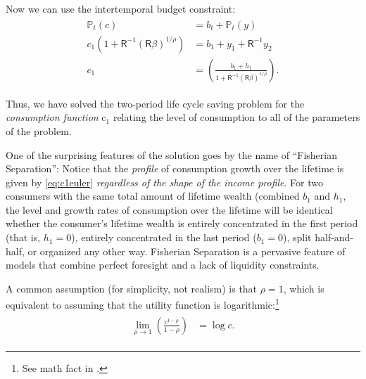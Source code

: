 \documentclass{scrartcl}
\begin{document}
  Now we can use the intertemporal budget constraint:
  \begin{equation}\begin{gathered}\begin{aligned} {\mathbb{P}}_{t}(\boldsymbol{\mathit{c}}) & = \boldsymbol{\mathit{b}}_{t}+{\mathbb{P}}_{t}(y) \\ \boldsymbol{\mathit{c}}_{1}\left(1+\mathsf{R}^{-1}(\mathsf{R}\beta)^{1/\rho}\right) & = \boldsymbol{\mathit{b}}_{1}+\boldsymbol{\mathit{y}}_{1}+\mathsf{R}^{-1}\boldsymbol{\mathit{y}}_{2} \\ \boldsymbol{\mathit{c}}_{1} & = \left(\frac{\boldsymbol{\mathit{b}}_{1}+\boldsymbol{\mathit{h}}_{1}}{1+\mathsf{R}^{-1}(\mathsf{R}\beta)^{1/\rho}}\right).
      \end{aligned}\end{gathered}\end{equation}

  Thus, we have solved the two-period life cycle saving problem for the \textit{consumption function} $\mathrm{c}_{1}$ relating the level of consumption to all of the parameters of the problem.

  One of the surprising features of the solution goes by the name of ``Fisherian Separation'': Notice that the \textit{profile} of consumption growth over the lifetime is given by \eqref{eq:c1euler} \textit{regardless of the shape of the income profile}.  For two consumers with the same total amount of lifetime wealth (combined $\boldsymbol{\mathit{b}}_{1}$ and $\boldsymbol{\mathit{h}}_{1}$, the level and growth rates of consumption over the lifetime will be identical whether the consumer's lifetime wealth is entirely concentrated in the first period (that is, $\boldsymbol{\mathit{h}}_{1}=0$), entirely concentrated in the last period ($\boldsymbol{\mathit{b}}_{1}=0$), split half-and-half, or organized any other way. Fisherian Separation is a pervasive feature of models that combine perfect foresight and a lack of liquidity constraints.

  A common assumption (for simplicity, not realism) is that $\rho=1$, which is equivalent to assuming that the utility function is logarithmic:\footnote{See math fact \CRRALim in \MathFactsList.}
  \begin{equation}\begin{gathered}\begin{aligned} \lim_{\rho \rightarrow 1} \left(\frac{\boldsymbol{\mathit{c}}^{1-\rho}}{1-\rho}\right) & = \log c.
      \end{aligned}\end{gathered}\end{equation}
\end{document}
